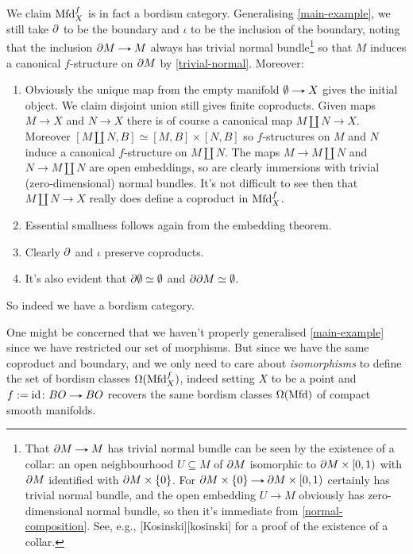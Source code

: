 \begin{definition}
  We claim $\mathrm{Mfd}^f_X$ is in fact a bordism category. Generalising
  \eqref{main-example}, we still take $\partial$ to be the boundary and
  $\iota$ to be the inclusion of the boundary, noting that the
  inclusion $\d M \to M$ always has trivial normal
  bundle\footnote{That $\d M \to M$ has trivial normal bundle can be
    seen by the existence of a collar: an open neighbourhood $U
    \subseteq M$ of $\partial M$ isomorphic to $\partial M \times [0, 1)$ with $\partial
    M$ identified with $\partial M \times \{0\}$. For $\d M \times \{0\} \to
    \d M \times [0,1)$ certainly has trivial normal bundle, and the
    open embedding $U \to M$ obviously has zero-dimensional normal
    bundle, so then it's immediate from \eqref{normal-composition}. See,
    e.g., [Kosinski][kosinski] for a proof of the existence of a
    collar.} so that $M$ induces a canonical $f$-structure on $\partial M$
  by \eqref{trivial-normal}. Moreover:
  \begin{enumerate}
  \item Obviously the unique map from the empty manifold $\e \to X$
    gives the initial object. We claim disjoint union still gives
    finite coproducts. Given maps $M \to X$ and $N \to X$ there is of
    course a canonical map $M \amalg N \to X$. Moreover $[M \amalg N,
    B] \simeq [M, B] \times [N, B]$ so $f$-structures on $M$ and $N$
    induce a canonical $f$-structure on $M \amalg N$. The maps $M \to
    M \amalg N$ and $N \to M \amalg N$ are open embeddings, so are
    clearly immersions with trivial (zero-dimensional) normal
    bundles. It's not difficult to see then that $M \amalg N \to X$
    really does define a coproduct in $\mathrm{Mfd}^f_X$.
  \item Essential smallness follows again from the embedding theorem.
  \item Clearly $\partial$ and $\iota$ preserve coproducts.
  \item It's also evident that $\partial\emptyset \simeq \emptyset$ and $\partial\partial M \simeq \emptyset$.
  \end{enumerate}
  So indeed we have a bordism category.
\end{definition}

\begin{remark}
  One might be concerned that we haven't properly generalised
  \eqref{main-example} since we have restricted our set of
  morphisms. But since we have the same coproduct and boundary, and we
  only need to care about \emph{isomorphisms} to define the set of bordism
  classes $\Omega(\mathrm{Mfd}^f_X)$, indeed setting $X$ to be a point and $f
  \ce \id \c BO \to BO$ recovers the same bordism classes
  $\Omega(\mathrm{Mfd})$ of compact smooth manifolds.
\end{remark}


